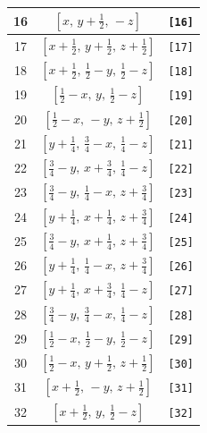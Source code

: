 \documentclass[fleqn,8pt]{jsarticle}
\begin{document}
\begin{longtable}{ccc}
16 & $\left[ x,\, y + \frac{1}{2},\, - z \right]$ & {\tt [16]} \\ \hline
17 & $\left[ x + \frac{1}{2},\, y + \frac{1}{2},\, z + \frac{1}{2} \right]$ & {\tt [17]} \\ \hline
18 & $\left[ x + \frac{1}{2},\, \frac{1}{2} - y,\, \frac{1}{2} - z \right]$ & {\tt [18]} \\ \hline
19 & $\left[ \frac{1}{2} - x,\, y,\, \frac{1}{2} - z \right]$ & {\tt [19]} \\ \hline
20 & $\left[ \frac{1}{2} - x,\, - y,\, z + \frac{1}{2} \right]$ & {\tt [20]} \\ \hline
21 & $\left[ y + \frac{1}{4},\, \frac{3}{4} - x,\, \frac{1}{4} - z \right]$ & {\tt [21]} \\ \hline
22 & $\left[ \frac{3}{4} - y,\, x + \frac{3}{4},\, \frac{1}{4} - z \right]$ & {\tt [22]} \\ \hline
23 & $\left[ \frac{3}{4} - y,\, \frac{1}{4} - x,\, z + \frac{3}{4} \right]$ & {\tt [23]} \\ \hline
24 & $\left[ y + \frac{1}{4},\, x + \frac{1}{4},\, z + \frac{3}{4} \right]$ & {\tt [24]} \\ \hline
25 & $\left[ \frac{3}{4} - y,\, x + \frac{1}{4},\, z + \frac{3}{4} \right]$ & {\tt [25]} \\ \hline
26 & $\left[ y + \frac{1}{4},\, \frac{1}{4} - x,\, z + \frac{3}{4} \right]$ & {\tt [26]} \\ \hline
27 & $\left[ y + \frac{1}{4},\, x + \frac{3}{4},\, \frac{1}{4} - z \right]$ & {\tt [27]} \\ \hline
28 & $\left[ \frac{3}{4} - y,\, \frac{3}{4} - x,\, \frac{1}{4} - z \right]$ & {\tt [28]} \\ \hline
29 & $\left[ \frac{1}{2} - x,\, \frac{1}{2} - y,\, \frac{1}{2} - z \right]$ & {\tt [29]} \\ \hline
30 & $\left[ \frac{1}{2} - x,\, y + \frac{1}{2},\, z + \frac{1}{2} \right]$ & {\tt [30]} \\ \hline
31 & $\left[ x + \frac{1}{2},\, - y,\, z + \frac{1}{2} \right]$ & {\tt [31]} \\ \hline
32 & $\left[ x + \frac{1}{2},\, y,\, \frac{1}{2} - z \right]$ & {\tt [32]} \\
\end{longtable}
\end{document}
